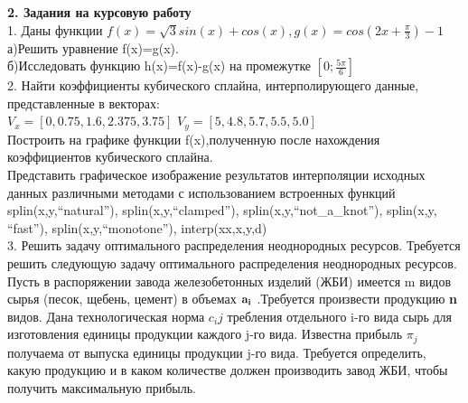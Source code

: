 \documentclass[russian,utf8,nocolumnxxxi,nocolumnxxxii]{eskdtext}
\begin{document}
\newpage

\begin{equation}\label{2}
\end{equation}
{\large\bf2. Задания на курсовую работу}
\\1. Даны функции $f(x)=\sqrt{3}sin(x)+cos(x),g(x)=cos(2x+\frac{\pi}{3})-1$
\\а)Решить уравнение f(x)=g(x).
\\б)Исследовать функцию h(x)=f(x)-g(x) на промежутке $[0;\frac{5\pi}{6}]$
\\2. Найти коэффициенты кубического сплайна, интерполирующего данные, представленные в векторах:\\
$V_{x}=[0,0.75,1.6,2.375,3.75]$
$V_{y}=[5,4.8,5.7,5.5,5.0]$\\
Построить на графике функции f(x),полученную после нахождения коэффициентов кубического сплайна. \\
Представить графическое изображение результатов интерполяции исходных данных различными методами с использованием встроенных функций splin(x,y,“natural”), splin(x,y,“clamped”), splin(x,y,“not\_a\_knot”), splin(x,y, “fast”), splin(x,y,“monotone”), interp(xx,x,y,d)\\
3. Решить задачу оптимального распределения неоднородных ресурсов.
Требуется решить следующую задачу оптимального распределения неоднородных ресурсов. Пусть в распоряжении завода железобетонных изделий (ЖБИ) имеется m видов сырья (песок, щебень, цемент) в объемах ${\bf a_i}$  .Требуется произвести продукцию {\bf n} видов. Дана технологическая норма $c_ij$  требления отдельного i-го вида сырь для изготовления единицы продукции каждого j-го вида. Известна прибыль $\pi_j$  получаема от выпуска единицы продукции j-го вида. Требуется определить, какую продукцию и в каком количестве должен производить завод ЖБИ, чтобы получить максимальную прибыль.

\begin{figure}[H]
\begin{center}
\begin{minipage}[h]{0.5\linewidth}
  \\
\end{minipage}
\end{center}
\end{figure}
\end{document}
